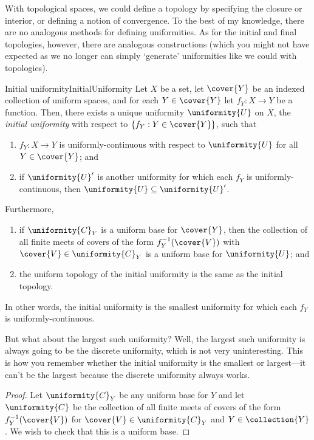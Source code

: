 With topological spaces, we could define a topology by specifying the closure or interior, or defining a notion of convergence.  To the best of my knowledge, there are no analogous methods for defining uniformities.  As for the initial and final topologies, however, there are analogous constructions (which you might not have expected as we no longer can simply `generate' uniformities like we could with topologies).
\begin{prp}{Initial uniformity}{InitialUniformity}
Let $X$ be a set, let $\cover{Y}$ be an indexed collection of uniform spaces, and for each $Y\in \cover{Y}$ let $f_Y:X\rightarrow Y$ be a function.  Then, there exists a unique uniformity $\uniformity{U}$ on $X$, the \emph{initial uniformity} with respect to $\{ f_Y:Y\in \cover{Y}\}$, such that
\begin{enumerate}
\item $f_Y:X\rightarrow Y$ is uniformly-continuous with respect to $\uniformity{U}$ for all $Y\in \cover{Y}$; and
\item if $\uniformity{U}'$ is another uniformity for which each $f_Y$ is uniformly-continuous, then $\uniformity{U}\subseteq \uniformity{U}'$.
\end{enumerate}

Furthermore,
\begin{enumerate}
\item if $\uniformity{C}_Y$ is a uniform base for $\cover{Y}$, then the collection of all finite meets of covers of the form $f_Y^{-1}(\cover{V})$ with $\cover{V}\in \uniformity{C}_Y$ is a uniform base for $\uniformity{U}$; and
\item the uniform topology of the initial uniformity is the same as the initial topology.
\end{enumerate}
\begin{rmk}
In other words, the initial uniformity is the smallest uniformity for which each $f_Y$ is uniformly-continuous.
\end{rmk}
\begin{rmk}
But what about the largest such uniformity?  Well, the largest such uniformity is always going to be the discrete uniformity, which is not very uninteresting.  This is how you remember whether the initial uniformity is the smallest or largest---it can't be the largest because the discrete uniformity always works.
\end{rmk}
\begin{proof}
Let $\uniformity{C}_Y$ be any uniform base for $Y$ and let $\uniformity{C}$ be the collection of all finite meets of covers of the form $f_Y^{-1}(\cover{V})$ for $\cover{V}\in \uniformity{C}_Y$ and $Y\in \collection{Y}$.  We wish to check that this is a uniform base.


\end{proof}
\end{prp}
